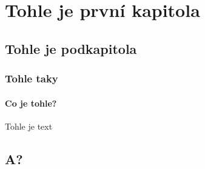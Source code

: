\hypertarget{tohle-je-prvnuxed-kapitola}{%
\chapter{Tohle je první kapitola}\label{tohle-je-prvnuxed-kapitola}}

\hypertarget{tohle-je-podkapitola}{%
\section{Tohle je podkapitola}\label{tohle-je-podkapitola}}

\hypertarget{tohle-taky}{%
\subsection{Tohle taky}\label{tohle-taky}}

\hypertarget{co-je-tohle}{%
\subsubsection{Co je tohle?}\label{co-je-tohle}}

Tohle je text

\hypertarget{a}{%
\section{A?}\label{a}}
